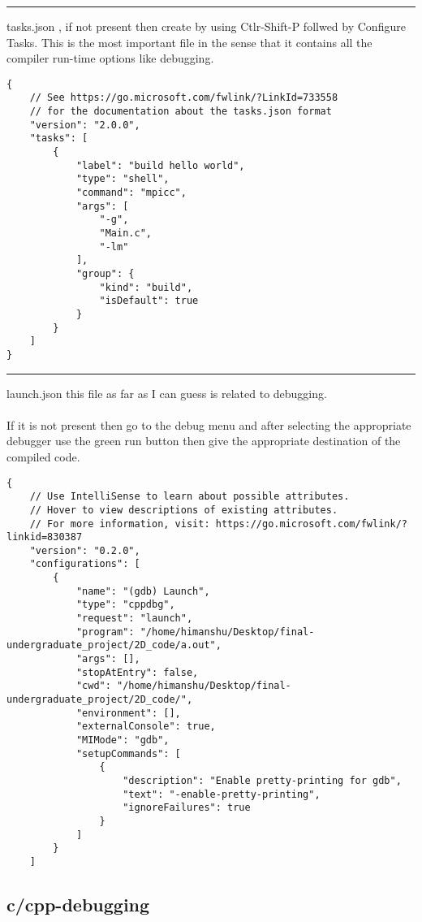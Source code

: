 \bigbreak
\noindent\rule{\textwidth}{1pt}
\bigbreak
\noindent
tasks.json , if not present then create by using Ctlr-Shift-P follwed by Configure Tasks.
This is the most important file in the sense that it contains all the compiler run-time options like debugging.

\begin{lstlisting}
{
    // See https://go.microsoft.com/fwlink/?LinkId=733558
    // for the documentation about the tasks.json format
    "version": "2.0.0",
    "tasks": [
        {
            "label": "build hello world",
            "type": "shell",
            "command": "mpicc",
            "args": [
                "-g",
                "Main.c",
                "-lm"
            ],
            "group": {
                "kind": "build",
                "isDefault": true
            }
        }
    ]
}
\end{lstlisting}


\bigbreak
\noindent\rule{\textwidth}{1pt}
\bigbreak


\noindent
launch.json this file as far as I can guess is related to debugging.
\\
\\
If it is not present then go to the debug menu and after selecting the appropriate debugger use the green run button then give the appropriate destination of the compiled code.

\begin{lstlisting}
{
    // Use IntelliSense to learn about possible attributes.
    // Hover to view descriptions of existing attributes.
    // For more information, visit: https://go.microsoft.com/fwlink/?linkid=830387
    "version": "0.2.0",
    "configurations": [
        {
            "name": "(gdb) Launch",
            "type": "cppdbg",
            "request": "launch",
            "program": "/home/himanshu/Desktop/final-undergraduate_project/2D_code/a.out",
            "args": [],
            "stopAtEntry": false,
            "cwd": "/home/himanshu/Desktop/final-undergraduate_project/2D_code/",
            "environment": [],
            "externalConsole": true,
            "MIMode": "gdb",
            "setupCommands": [
                {
                    "description": "Enable pretty-printing for gdb",
                    "text": "-enable-pretty-printing",
                    "ignoreFailures": true
                }
            ]
        }
    ]
\end{lstlisting}

\subsection{c/cpp-debugging}

